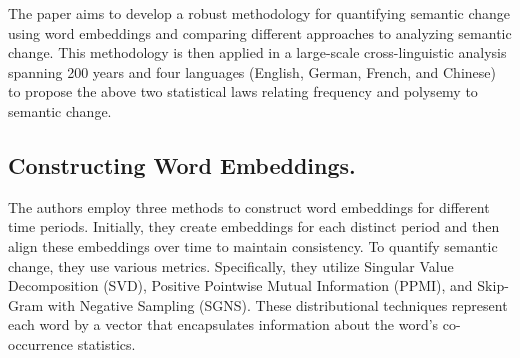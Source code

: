 The paper aims to develop a robust methodology for quantifying semantic change using word embeddings and comparing different approaches to analyzing semantic change.
This methodology is then applied in a large-scale cross-linguistic analysis spanning 200 years and four languages (English, German, French, and Chinese) to propose the above two statistical laws relating frequency and polysemy to semantic change.

\subsection{Constructing Word Embeddings.}\label{subsec:constructing-word-embeddings.}
The authors employ three methods to construct word embeddings for different time periods.
Initially, they create embeddings for each distinct period and then align these embeddings over time to maintain consistency.
To quantify semantic change, they use various metrics.
Specifically, they utilize Singular Value Decomposition (SVD), Positive Pointwise Mutual Information (PPMI), and Skip-Gram with Negative Sampling (SGNS).
These distributional techniques represent each word by a vector that encapsulates information about the word’s co-occurrence statistics.

